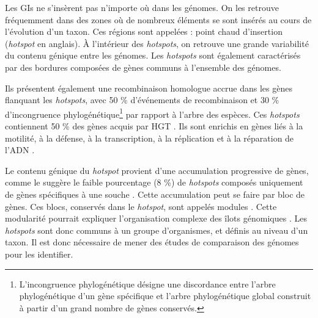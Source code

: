 Les GIs ne s'insèrent pas n'importe où dans les génomes. On les retrouve fréquemment dans des zones où de nombreux éléments se sont insérés au cours de l'évolution d'un taxon. Ces régions sont appelées : point chaud d'insertion (\textit{hotspot} en anglais).
À l'intérieur des \textit{hotspots}, on retrouve une grande variabilité du contenu génique entre les génomes. Les \textit{hotspots} sont également caractérisés par des bordures composées de gènes communs à l'ensemble des génomes. 

Ils présentent également une recombinaison homologue accrue dans les gènes flanquant les \textit{hotspots}, avec 50 \% d’événements de recombinaison et 30 \% d’incongruence phylogénétique\footnote{L'incongruence phylogénétique désigne une discordance entre l’arbre phylogénétique d’un gène spécifique et l’arbre phylogénétique global construit à partir d'un grand nombre de gènes conservés.} par rapport à l'arbre des espèces. Ces \textit{hotspots} contiennent 50 \% des gènes acquis par HGT \cite{oliveira_chromosomal_2017}. Ils sont enrichis en gènes liés à la motilité, à la défense, à la transcription, à la réplication et à la réparation de l’ADN \cite{flores_ramos_genomic_2021}.

Le contenu génique du \textit{hotspot} provient d'une accumulation progressive de gènes, comme le suggère le faible pourcentage (8 \%) de \textit{hotspots} composés uniquement de gènes spécifiques à une souche \cite{oliveira_chromosomal_2017}. Cette accumulation peut se faire par bloc de gènes. Ces blocs, conservés dans le \textit{hotspot}, sont appelés modules \cite{lescat_module_2009}. Cette modularité pourrait expliquer l'organisation complexe des îlots génomiques \cite{touchon_organised_2009}.
Les \textit{hotspots} sont donc communs à un groupe d'organismes, et définis au niveau d'un taxon. Il est donc nécessaire de mener des études de comparaison des génomes pour les identifier.